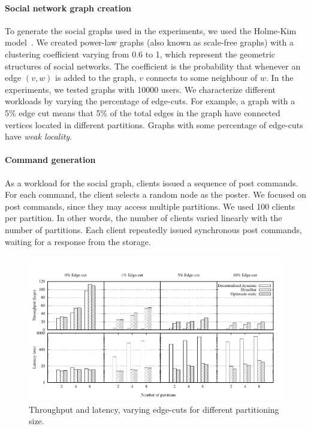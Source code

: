 \paragraph*{Social network graph creation}
%
To generate the social graphs used in the experiments, we used the
Holme-Kim model~\cite{holme-kim}.  We created power-law graphs (also
known as scale-free graphs) with a clustering coefficient varying from
0.6 to 1, which represent the geometric structures of social
networks. The coefficient is the probability that whenever an edge
$(v, w)$ is added to the graph, $v$ connects to some neighbour of $w$.
In the experiments, we tested graphs with 10000 users. We characterize
different workloads by varying the percentage of edge-cuts.  For
example, a graph with a 5\% edge cut means that 5\% of the total edges
in the graph have connected vertices located in different partitions.
Graphs with some percentage of edge-cuts have \emph{weak locality}.

\paragraph*{Command generation}
%
As a workload for the social graph, clients issued a sequence of post
commands.  For each command, the client selects a random node as
the poster.  We focused on post commands, since they may access
multiple partitions.  We used 100 clients per partition. In other
words, the number of clients varied linearly with the number of
partitions.  Each client repeatedly issued synchronous post commands,
waiting for a response from the storage.

\begin{figure}[ht!]
	\includegraphics{figures/experiments/throughput-latency-avg-all}
	\caption{Throughput and latency, varying edge-cuts for different partitioning size.}
	\label{fig:varying_edge_cut}
\end{figure}




